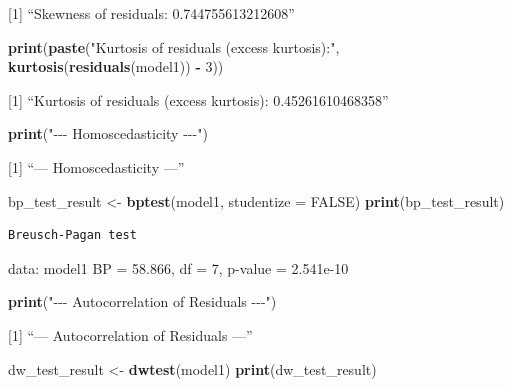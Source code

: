 \documentclass[
]{article}
\newenvironment{Shaded}{\begin{snugshade}}{\end{snugshade}}
\newcommand{\AttributeTok}[1]{\textcolor[rgb]{0.13,0.29,0.53}{#1}}
\newcommand{\ConstantTok}[1]{\textcolor[rgb]{0.56,0.35,0.01}{#1}}
\newcommand{\DecValTok}[1]{\textcolor[rgb]{0.00,0.00,0.81}{#1}}
\newcommand{\FunctionTok}[1]{\textcolor[rgb]{0.13,0.29,0.53}{\textbf{#1}}}
\newcommand{\NormalTok}[1]{#1}
\newcommand{\OtherTok}[1]{\textcolor[rgb]{0.56,0.35,0.01}{#1}}
\newcommand{\SpecialCharTok}[1]{\textcolor[rgb]{0.81,0.36,0.00}{\textbf{#1}}}
\newcommand{\StringTok}[1]{\textcolor[rgb]{0.31,0.60,0.02}{#1}}
\begin{document}
{[}1{]} ``Skewness of residuals: 0.744755613212608''

\begin{Shaded}
\begin{Highlighting}[]
  \FunctionTok{print}\NormalTok{(}\FunctionTok{paste}\NormalTok{(}\StringTok{"Kurtosis of residuals (excess kurtosis):"}\NormalTok{, }\FunctionTok{kurtosis}\NormalTok{(}\FunctionTok{residuals}\NormalTok{(model1)) }\SpecialCharTok{{-}} \DecValTok{3}\NormalTok{))}
\end{Highlighting}
\end{Shaded}

{[}1{]} ``Kurtosis of residuals (excess kurtosis): 0.45261610468358''

\begin{Shaded}
\begin{Highlighting}[]
  \FunctionTok{print}\NormalTok{(}\StringTok{"{-}{-}{-} Homoscedasticity {-}{-}{-}"}\NormalTok{)}
\end{Highlighting}
\end{Shaded}

{[}1{]} ``--- Homoscedasticity ---''

\begin{Shaded}
\begin{Highlighting}[]
\NormalTok{  bp\_test\_result }\OtherTok{\textless{}{-}} \FunctionTok{bptest}\NormalTok{(model1, }\AttributeTok{studentize =} \ConstantTok{FALSE}\NormalTok{)}
  \FunctionTok{print}\NormalTok{(bp\_test\_result)}
\end{Highlighting}
\end{Shaded}

\begin{verbatim}
Breusch-Pagan test
\end{verbatim}

data: model1 BP = 58.866, df = 7, p-value = 2.541e-10

\begin{Shaded}
\begin{Highlighting}[]
  \FunctionTok{print}\NormalTok{(}\StringTok{"{-}{-}{-} Autocorrelation of Residuals {-}{-}{-}"}\NormalTok{)}
\end{Highlighting}
\end{Shaded}

{[}1{]} ``--- Autocorrelation of Residuals ---''

\begin{Shaded}
\begin{Highlighting}[]
\NormalTok{  dw\_test\_result }\OtherTok{\textless{}{-}} \FunctionTok{dwtest}\NormalTok{(model1)}
  \FunctionTok{print}\NormalTok{(dw\_test\_result)}
\end{Highlighting}
\end{Shaded}
\end{document}
